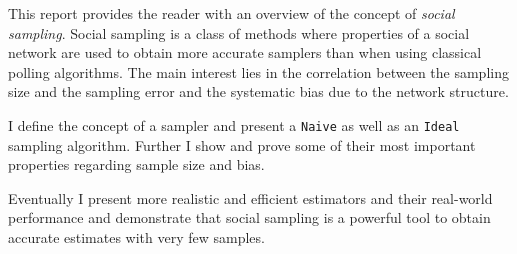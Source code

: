 This report provides the reader with an overview of the concept of \textit{social sampling}.
Social sampling is a class of methods where properties of a social network are used to obtain more accurate samplers than when using classical polling algorithms. The main interest lies in the correlation between the sampling size and the sampling error and the systematic bias due to the network structure.

I define the concept of a sampler and present a \texttt{Naive} as well as an \texttt{Ideal} sampling algorithm. Further I show and prove some of their most important properties regarding sample size and bias.

Eventually I present more realistic and efficient estimators and their real-world performance and demonstrate that social sampling is a powerful tool to obtain accurate estimates with very few samples.
